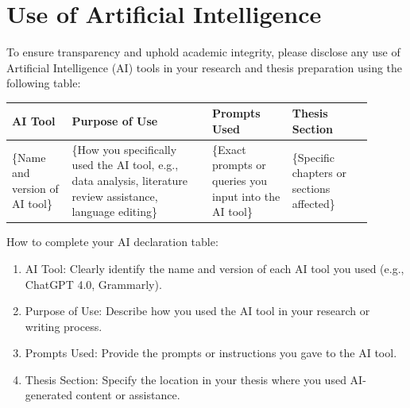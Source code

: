 



\section*{Use of Artificial Intelligence}

\begin{instructional}


    To ensure transparency and uphold academic integrity, please disclose any use of Artificial Intelligence (AI) tools in your research and thesis preparation using the following table:\\

    \begin{table}[h]
        \begin{center}
        {\color{UQPurple}
        \begin{tabular}{|p{0.15\linewidth} | p{0.35\linewidth} | p{0.20\linewidth} | p{0.20\linewidth}|}
        \hline
        \textbf{AI Tool} & \textbf{Purpose of Use} & \textbf{Prompts Used} & \textbf{Thesis Section} \\ \hline
        \{Name and version of AI tool\} & 
        \{How you specifically used the AI tool, e.g., data analysis, literature review assistance, language editing\} & 
        \{Exact prompts or queries you input into the AI tool\} & 
        \{Specific chapters or sections affected\} \\ 
        \hline
        \end{tabular}
        }
        \end{center}
    \end{table}

    \noindent
    How to complete your AI declaration table:
    \begin{enumerate}
        \item AI Tool: Clearly identify the name and version of each AI tool you used (e.g., ChatGPT 4.0, Grammarly).
        \item Purpose of Use: Describe how you used the AI tool in your research or writing process.
        \item Prompts Used: Provide the prompts or instructions you gave to the AI tool.
        \item Thesis Section: Specify the location in your thesis where you used AI-generated content or assistance.
    \end{enumerate}


\end{instructional}
